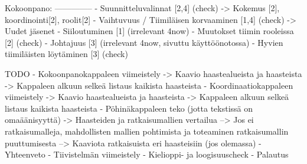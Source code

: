 Kokoonpano:
--------------
- Suunnitteluvalinnat                       [2,4] (check)
    -> Kokemus [2], koordinointi[2], roolit[2]
- Vaihtuvuus / Tiimiläisen korvaaminen      [1,4] (check)
    -> Uudet jäsenet
- Siiloutuminen                             [1] (irrelevant 4now)
- Muutokset tiimin rooleissa                [2] (check)
- Johtajuus                                 [3] (irrelevant 4now, sivuttu käyttöönotossa)
- Hyvien tiimiläisten löytäminen            [3] (check)

    TODO    
- Kokoonpanokappaleen viimeistely
-> Kaavio haastealueista ja haasteista
-> Kappaleen alkuun selkeä listaus kaikista haasteista
- Koordinaatiokappaleen viimeistely
-> Kaavio haastealueista ja haasteista
-> Kappaleen alkuun selkeä listaus kaikista haasteista
- Pöhinäkappaleen teko (jotta tekstissä on omaäänisyyttä)
-> Haasteiden ja ratkaisumallien vertailua
--> Jos ei ratkaisumalleja, mahdollisten mallien pohtimista ja toteaminen ratkaisumallin puuttumisesta
--> Kaaviota ratkaisuista eri haasteisiin (jos olemassa)
- Yhteenveto
- Tiivistelmän viimeistely
- Kielioppi- ja loogisuuscheck
- Palautus
